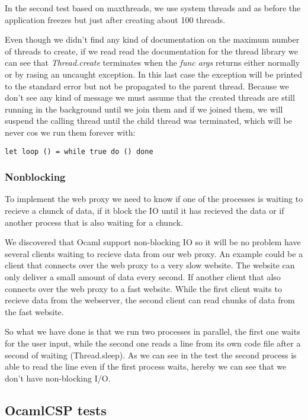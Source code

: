 \documentclass[a4paper,12pt]{article}
\begin{document}
In the second test based on maxthreads, we use system threads and as before
the application freezes but just after creating about 100 threads.

Even though we didn't find any kind of documentation on the maximum number
of threads to create, if we read read the documentation for the thread library
we can see that {\it Thread.create} terminates when the {\it func args}
returns either normally or by rasing an uncaught exception. In this last case
the exception will be printed to the standard error but not be propagated to
the parent thread. Because we don't see any kind of message we must assume
that the created threads are still running in the background until we join
them and if we joined them, we will suspend the calling thread until the
child thread was terminated, which will be never cos we run them forever with:
\begin{verbatim}
let loop () = while true do () done
\end{verbatim}

\subsubsection{Nonblocking}
To implement the web proxy we need to know if one of the processes is waiting
to recieve a chunck of data, if it block the IO until it has recieved the data
or if another process that is also waiting for a chunck.

We discovered that Ocaml support non-blocking IO so it will be no problem have
several clients waiting to recieve data from our web proxy. An example could
be a client that connects over the web proxy to a very slow website. The website
can only deliver a small amount of data every second. If another client that
also connects over the web proxy to a fast website. While the first client
waits to recieve data from the webserver, the second client can read chunks
of data from the fast website.

So what we have done is that we run two processes in parallel, the first one
waits for the user input, while the second one reads a line from its own
code file after a second of waiting (Thread.sleep). As we can see in the test
the second process is able to read the line even if the first process waits,
hereby we can see that we don't have non-blocking I/O.

\subsection{OcamlCSP tests}
\label{ocamlcsptests}
\end{document}

